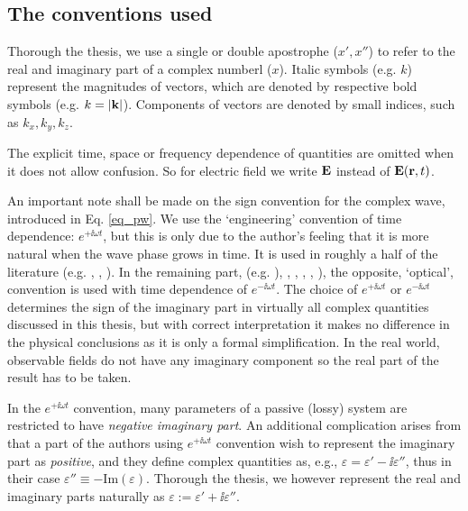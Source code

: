 \subsection{The conventions used}%
Thorough the thesis, we use a single or double apostrophe ($x', x''$) to refer to the real and imaginary part of a complex numberl ($x$). Italic symbols (e.g. $k$) represent the magnitudes of vectors, which are denoted by respective bold symbols (e.g. $k = |{\mathbf{k}}|$). Components of vectors are denoted by small indices, such as $k_x, k_y, k_z$.

The explicit time, space or frequency dependence of quantities are omitted when it does not allow confusion. So for electric field we write $\mathbf{E}$ instead of $\mathbf{E}({\mathbf{r}},t)$.

An important note shall be made on the sign convention for the complex wave, introduced in Eq. \ref{eq_pw}.
We use the `engineering' convention of time dependence: $e^{+\ii \omega t}$, but this is only due to the author's feeling that it is more natural when the wave phase grows in time. 
It is used in  roughly a half of the literature (e.g. \cite[p. 9]{engheta2006book}, \cite[pp. 21, 99]{krowne2007book}, \cite[(Chapters 1-4, 6, 9, 10)]{eleftheriades2005book}).  In the remaining part, (e.g. \cite[(Chapters 5, 7, 8)]{eleftheriades2005book}), \cite{klingshirn2007semiconductor}, \cite{jackson1962book}, \cite{veselago1968}, \cite{born1999book}, \cite[p. 5]{noginov2011book}), the opposite, `optical', convention is used with time dependence of $e^{-\ii \omega t}$. The choice of $e^{+\ii\omega t}$ or $e^{-\ii\omega t}$ determines the sign of the imaginary part in virtually all complex quantities discussed in this thesis, but with correct interpretation it makes no difference in the physical conclusions as it is only a formal simplification.
In the real world, observable fields do not have any imaginary component so the real part of the result has to be taken. 

In the $e^{+\ii\omega t}$ convention, many parameters of a passive (lossy) system are restricted to have \textit{negative imaginary part}.  An additional complication arises from that a part of the authors using $e^{+\ii\omega t}$ convention wish to represent the imaginary part as \textit{positive}, and they define complex quantities as, e.g., $\varepsilon = \varepsilon' - \ii \varepsilon''$, %
thus in their case $\varepsilon''\equiv -\text{Im}(\varepsilon)$. Thorough the thesis, we however represent the real and imaginary parts naturally as $\varepsilon := \varepsilon' + \ii \varepsilon''$.

